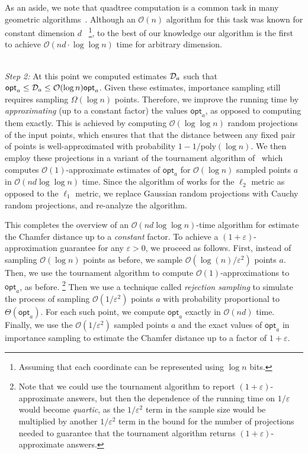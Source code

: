 \documentclass[11pt]{article}
\newcommand{\eps}{\varepsilon}
\theoremstyle{plain}
\newcommand{\OO}{\mathcal{O}}
\newcommand{\opt}{\mathsf{opt}}
\begin{document}
As an aside, we note that quadtree computation is a common task in many geometric algorithms~\cite{har2011geometric}. Although an $\OO(n)$ algorithm for this task was known for constant dimension $d$ ~\cite{C08}\footnote{Assuming that each coordinate can be represented using $\log n$ bits.},  to the best of our knowledge our algorithm is the first to achieve $\OO(n d \cdot \log \log n)$ time for arbitrary dimension. 

\ \\
{\em Step 2:} At this point we computed estimates $\mathcal{D}_a$ such that $\opt_a \le \calD_a \le \OO(\log n) \opt_a$. Given these estimates, importance sampling still requires sampling $\Omega(\log n)$ points. Therefore, we improve the running time by {\em approximating} (up to a constant factor) the values $\opt_a$, as opposed to computing them exactly. This is achieved by computing $\OO(\log \log n)$ random projections of the input points, which ensures that that the distance between any fixed pair of points is well-approximated with probability $1-1/\mbox{poly}(\log n)$. We then employ these projections in a variant of the tournament algorithm of~\cite{K97} which computes $\OO(1)$-approximate estimates of $\opt_a$ for $\OO(\log n)$ sampled points $a$ in $\OO(nd \log \log n)$ time. Since the algorithm of \cite{K97} works for the $\ell_2$ metric as opposed to the $\ell_1$ metric, we replace Gaussian random projections with Cauchy random projections, and re-analyze the algorithm. 

This completes the overview of an $\OO(nd \log \log n)$-time algorithm for estimate the Chamfer distance up to a {\em constant} factor. To achieve a $(1+\eps)$-approximation guarantee for any $\eps>0$, we proceed as follows. 
 First, instead of sampling $\OO(\log n)$ points as before, we sample $\OO(\log(n)/\eps^2)$ points $a$. Then, we use the tournament algorithm to compute $\OO(1)$-approximations to $\opt_a$, as before. \footnote{Note that we could use the tournament algorithm to report $(1+\eps)$-approximate answers, but then the dependence of the running time on  $1/\eps$ would become {\em quartic}, as  the $1/\eps^2$ term in the sample size would be multiplied by another $1/\eps^2$ term in the bound for the number of projections needed to guarantee that the tournament algorithm returns $(1+\eps)$-approximate answers. } Then we use a technique called {\em rejection sampling} to simulate the process of sampling $\OO(1/\eps^2)$ points $a$ with probability proportional to $\Theta(\opt_a)$. For each such point, we compute $\opt_a$ exactly in $\OO(nd)$ time. Finally, we use the $\OO(1/\eps^2)$ sampled points $a$ and the exact values of $\opt_a$ in importance sampling to estimate the Chamfer distance up to a factor of $1+\eps$.
\end{document}
